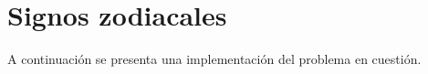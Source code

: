 \section{Signos zodiacales}

A continuación se presenta una implementación del problema en cuestión.

